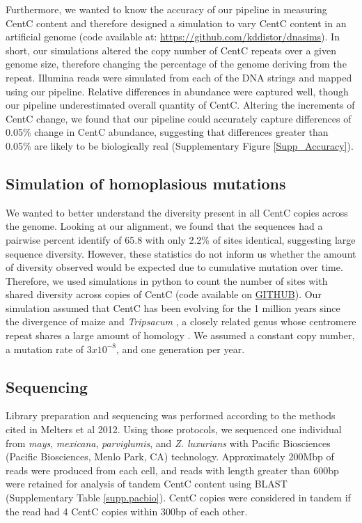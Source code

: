 Furthermore, we wanted to know the accuracy of our pipeline in measuring CentC content and therefore designed a simulation to vary CentC content in an artificial genome (code available at: \url{https://github.com/kddistor/dnasims}).  In short, our simulations altered the copy number of CentC repeats over a given genome size, therefore changing the percentage of the genome deriving from the repeat.  Illumina reads were simulated from each of the DNA strings and mapped using our pipeline.  Relative differences in abundance were captured well, though our pipeline underestimated overall quantity of CentC.  Altering the increments of CentC change, we found that our pipeline could accurately capture differences of 0.05\% change in CentC abundance, suggesting that differences greater than 0.05\% are likely to be biologically real (Supplementary Figure \ref{Supp_Accuracy}).  

\subsection*{Simulation of homoplasious mutations}

We wanted to better understand the diversity present in all CentC copies across the genome.  Looking at our alignment, we found that the sequences had a pairwise percent identify of 65.8 with only 2.2\% of sites identical, suggesting large sequence diversity.  However, these statistics do not inform us whether the amount of diversity observed would be expected due to cumulative mutation over time.  Therefore, we used simulations in python to count the number of sites with shared diversity across copies of CentC (code available on \url{GITHUB}).  Our simulation assumed that CentC has been evolving for the 1 million years since the divergence of maize and \emph{Tripsacum} \citep{Ross-Ibarra2009}, a closely related genus whose centromere repeat shares a large amount of homology \citep{Melters2012}.  We assumed a constant copy number, a mutation rate of $3 x 10^{-8}$, and one generation per year.  

\subsection*{Sequencing}
	
Library preparation and sequencing was performed according to the methods cited in Melters et al 2012.  Using those protocols, we sequenced one individual from \emph{mays}, \emph{mexicana}, \emph{parviglumis}, and \emph{Z. luxurians} with Pacific Biosciences (Pacific Biosciences, Menlo Park, CA) technology. Approximately 200Mbp of reads were produced from each cell, and reads with length greater than 600bp were retained for analysis of tandem CentC content using BLAST (Supplementary Table \ref{supp.pacbio}).  CentC copies were considered in tandem if the read had 4 CentC copies within 300bp of each other. 

